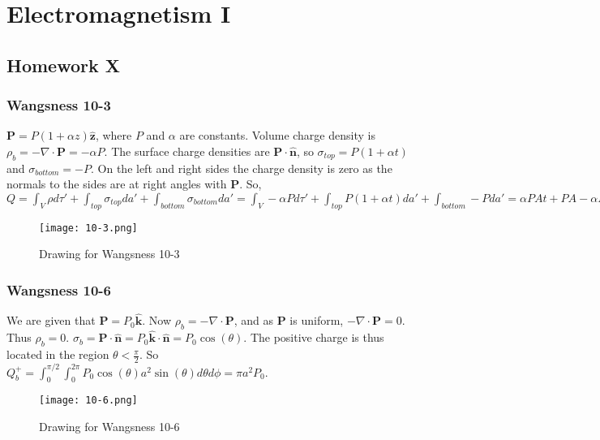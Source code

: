 \documentclass[crop=false,class=article,oneside]{standalone}
\begin{document}
    \ifx\ifphysicscourseselectromagnetismI\undefined
        \section*{Electromagnetism I}
        \setcounter{section}{10}
        \renewcommand\thesubfigure{%
            \arabic{section}.\arabic{figure}.\arabic{subfigure}%
        }
    \fi 
    \subsection{Homework X}
        \subsubsection{Wangsness 10-3}
        $\mathbf{P}= P(1+\alpha z)\hat{\mathbf{z}}$, where $P$ and $\alpha$ are constants. Volume charge density is $\rho_{b} = -\nabla \cdot \mathbf{P} = -\alpha P$. The surface charge densities are $\mathbf{P}\cdot \hat{\mathbf{n}}$, so $\sigma_{top} = P(1+\alpha t)$ and $\sigma_{bottom} = -P$. On the left and right sides the charge density is zero as the normals to the sides are at right angles with $\mathbf{P}$. So, $Q = \int_{V} \rho d\tau' + \int_{top} \sigma_{top} da' + \int_{bottom} \sigma_{bottom} da' = \int_{V}-\alpha P d\tau' + \int_{top}P(1+\alpha t) da' + \int_{bottom} - Pda' = \alpha PAt + PA - \alpha PA t - PA = 0$
        \begin{figure}[htbp]
            \centering
            {\texttt{[image: 10-3.png]}}
            \caption{Drawing for Wangsness 10-3}
        \end{figure}
        \subsubsection{Wangsness 10-6}
        We are given that $\mathbf{P} = P_0 \hat{\mathbf{k}}$. Now $\rho_{b} = -\nabla \cdot \mathbf{P}$, and as $\mathbf{P}$ is uniform, $-\nabla \cdot \mathbf{P} = 0$. Thus $\rho_b = 0$. $\sigma_b = \mathbf{P}\cdot \hat{\mathbf{n}} = P_0 \hat{\mathbf{k}} \cdot \hat{\mathbf{n}} = P_0 \cos(\theta)$. The positive charge is thus located in the region $\theta < \frac{\pi}{2}$. So $Q_b^+ = \int_{0}^{\pi/2}\int_{0}^{2\pi} P_0 \cos(\theta) a^2 \sin(\theta) d\theta d\phi = \pi a^2 P_0$.
        \begin{figure}[htbp]
            \centering
            {\texttt{[image: 10-6.png]}}
            \caption{Drawing for Wangsness 10-6}
        \end{figure}
\end{document}
